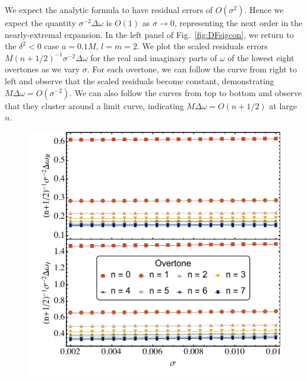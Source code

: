 \begin{refsection}
We expect the analytic formula to have residual errors of $O(\sigma^2)$. 
Hence we expect the quantity $\sigma^{-2}\Delta \omega$ is $O(1)$ as $\sigma \to 0$, representing the next order in the nearly-extremal expansion. 
In the left panel of Fig.~\ref{fig:DFsigcon}, we return to the $\delta^2 <0$ case $a = 0.1M$, $l = m =2$. We plot the scaled residuals errors $M (n+1/2)^{-1}\sigma^{-2}\Delta \omega$ for the real and imaginary parts of $\omega$ of the lowest eight overtones as we vary $\sigma$.
For each overtone, we can follow the curve from right to left and observe that the scaled residuals become constant, demonstrating $M\Delta\omega = O(\sigma^{-2})$. 
We can also follow the curves from top to bottom and observe that they cluster around a limit curve, indicating $M\Delta \omega=O(n+1/2)$ at large $n$. 

\begin{figure}[tb]
\includegraphics[width =1.0 \columnwidth]{chapter_extremal/etc/sigplot_a_1_s_0.pdf}

\end{figure}
\end{refsection}
